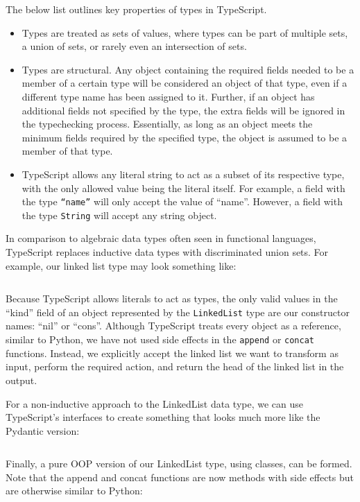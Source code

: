 \documentclass{article}
\begin{document}
The below list outlines key properties of types in TypeScript.
\begin{itemize}
    \item Types are treated as sets of values, where types can be part of multiple sets,
    a union of sets, or rarely even an intersection of sets.
    \item Types are structural. Any object containing the required fields needed to be a member of a certain type
    will be considered an object of that type, even if a different type name has been assigned to it.
    Further, if an object has additional fields not specified by the type,
    the extra fields will be ignored in the typechecking process. Essentially, as long as an object meets the minimum
    fields required by the specified type, the object is assumed to be a member of that type.
    \item TypeScript allows any literal string to act as a subset of its respective type,
    with the only allowed value being the literal itself.
    For example, a field with the type \texttt{``name''} will only accept the value of ``name''.
    However, a field with the type \texttt{String} will accept any string object.

\end{itemize}

In comparison to algebraic data types often seen in functional languages, TypeScript replaces inductive data types
with discriminated union sets. For example, our linked list type may look something like:
\inputminted{typescript}{linked_list/main.ts}

Because TypeScript allows literals to act as types, the only valid values in the ``kind'' field
of an object represented by the \texttt{LinkedList} type are our constructor names: ``nil'' or ``cons''.
Although TypeScript treats every object as a reference, similar to Python, we have not used side effects
in the \texttt{append} or \texttt{concat} functions. Instead, we explicitly accept the linked list we want to transform as
input, perform the required action, and return the head of the linked list in the output.

For a non-inductive approach to the LinkedList data type, we can use TypeScript's interfaces to create something that
looks much more like the Pydantic version:
\inputminted{typescript}{linked_list/main_interface.ts}

Finally, a pure OOP version of our LinkedList type, using classes, can be formed.
Note that the append and concat functions are now methods with side effects but are otherwise similar to Python:
\inputminted{typescript}{linked_list/main_class.ts}
\end{document}
